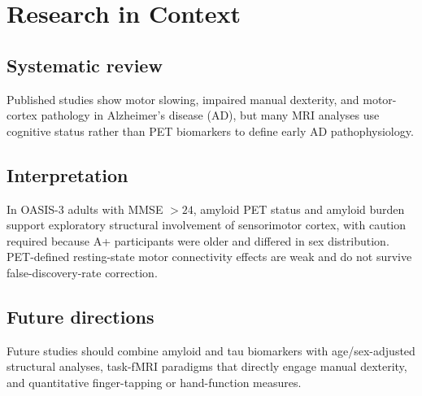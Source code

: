 \documentclass[review,3p,times]{elsarticle}
\begin{document}
\section*{Research in Context}

\subsection*{Systematic review}
Published studies show motor slowing, impaired manual dexterity, and motor-cortex pathology in Alzheimer's disease (AD), but many MRI analyses use cognitive status rather than PET biomarkers to define early AD pathophysiology.

\subsection*{Interpretation}
In OASIS-3 adults with MMSE $>24$, amyloid PET status and amyloid burden support exploratory structural involvement of sensorimotor cortex, with caution required because A+ participants were older and differed in sex distribution. PET-defined resting-state motor connectivity effects are weak and do not survive false-discovery-rate correction.

\subsection*{Future directions}
Future studies should combine amyloid and tau biomarkers with age/sex-adjusted structural analyses, task-fMRI paradigms that directly engage manual dexterity, and quantitative finger-tapping or hand-function measures.
\end{document}
